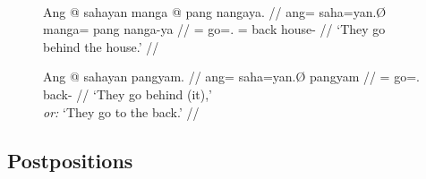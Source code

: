 \begin{figure}
\begin{minipage}[t]{.6\remaining}
\pex\label{ex:separatevb}
	\a {}
	\a {}
	\a {}
\xe
\end{minipage}
~
\begin{minipage}[t]{.4\remaining}
\pex\label{ex:doubleusevb}
	\a {}
	\a {}
	\a {}
\xe
\end{minipage}
\end{figure}

\begin{figure}
\pex
\a\begingl
	\gla Ang @ sahayan manga @ pang nangaya. //
	\glb ang= saha=yan.Ø manga= pang nanga-ya //
	\glc \AgtT{}= go=\Tpl{}.\Top{} \Dir{}= back house-\Loc{} //
	\glft `They go behind the house.' //
\endgl

\a\label{ex:ppasnoun}\begingl
	\gla Ang @ sahayan pangyam. //
	\glb ang= saha=yan.Ø pangyam //
	\glc \AgtT{}= go=\Tpl{}.\Top{} back-\Dat{} //
	\glft `They go behind (it),'\\
		\textit{or:} `They go to the back.' //
\endgl
\xe
\end{figure}


\subsection{Postpositions}
\label{subsec:postpos}

